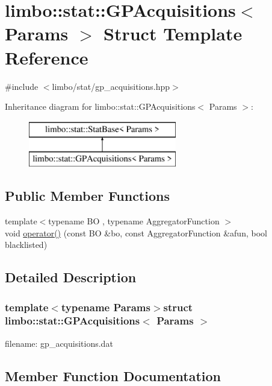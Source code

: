 \hypertarget{structlimbo_1_1stat_1_1_g_p_acquisitions}{}\section{limbo\+:\+:stat\+:\+:G\+P\+Acquisitions$<$ Params $>$ Struct Template Reference}
\label{structlimbo_1_1stat_1_1_g_p_acquisitions}


{\ttfamily \#include $<$limbo/stat/gp\+\_\+acquisitions.\+hpp$>$}

Inheritance diagram for limbo\+:\+:stat\+:\+:G\+P\+Acquisitions$<$ Params $>$\+:\begin{figure}[H]
\begin{center}
\leavevmode
\includegraphics[height=2.000000cm]{structlimbo_1_1stat_1_1_g_p_acquisitions}
\end{center}
\end{figure}
\subsection*{Public Member Functions}
\begin{DoxyCompactItemize}
\item 
{\footnotesize template$<$typename B\+O , typename Aggregator\+Function $>$ }\\void \hyperlink{structlimbo_1_1stat_1_1_g_p_acquisitions_a5b6d7301b0696e77a8a9276d1d12d614}{operator()} (const B\+O \&bo, const Aggregator\+Function \&afun, bool blacklisted)
\end{DoxyCompactItemize}


\subsection{Detailed Description}
\subsubsection*{template$<$typename Params$>$struct limbo\+::stat\+::\+G\+P\+Acquisitions$<$ Params $>$}

filename\+: {\ttfamily gp\+\_\+acquisitions.\+dat} 

\subsection{Member Function Documentation}
\hypertarget{structlimbo_1_1stat_1_1_g_p_acquisitions_a5b6d7301b0696e77a8a9276d1d12d614}{}
